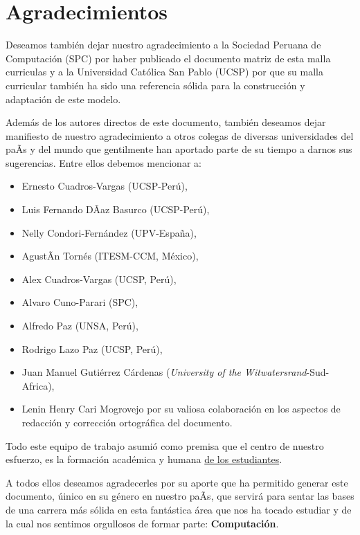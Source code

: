 \chapter*{Agradecimientos}\label{chap:cs-ack}
%

Deseamos también dejar nuestro agradecimiento a la Sociedad Peruana de Computación (SPC) por 
haber publicado el documento matriz de esta malla curriculas y a la Universidad Católica San Pablo (UCSP) 
por que su malla curricular también ha sido una referencia sólida para la construcción y adaptación de este modelo.

Además de los autores directos de este documento, también deseamos dejar manifiesto de nuestro 
agradecimiento a otros colegas de diversas universidades del paÃ­s y del mundo que gentilmente 
han aportado parte de su tiempo a darnos sus sugerencias. Entre ellos debemos mencionar a:

\begin{itemize}
\item Ernesto Cuadros-Vargas (UCSP-Perú), 
\item Luis Fernando DÃ­az Basurco (UCSP-Perú), 
\item Nelly Condori-Fernández (UPV-España), 
\item AgustÃ­n Tornés (ITESM-CCM, México), 
\item Alex Cuadros-Vargas (UCSP, Perú),
\item Alvaro Cuno-Parari (SPC),
\item Alfredo Paz (UNSA, Perú), 
\item Rodrigo Lazo Paz (UCSP, Perú),
\item Juan Manuel Gutiérrez Cárdenas (\textit{University of the Witwatersrand}-Sud-Africa),
\item Lenin Henry Cari Mogrovejo por su valiosa colaboración en los aspectos de redacción y corrección ortográfica del documento.
\end{itemize}

Todo este equipo de trabajo asumió como premisa que el centro de nuestro esfuerzo, 
es la formación académica y humana \underline{de los estudiantes}.

A todos ellos deseamos agradecerles por su aporte que ha permitido generar 
este documento, úinico en su género en nuestro paÃ­s, que servirá para sentar las 
bases de una carrera más sólida en esta fantástica área que nos ha tocado estudiar y 
de la cual nos sentimos orgullosos de formar parte: \textbf{Computación}.
